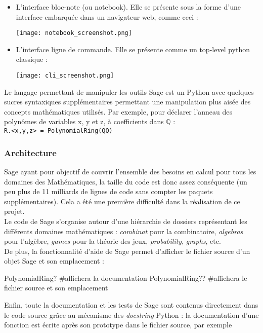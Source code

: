 \documentclass[12pt]{article}
\begin{document}
\noindent\begin{minipage}{\linewidth}
\begin{itemize}
\item L'interface bloc-note (ou notebook). Elle se présente sous la forme
 d'une interface embarquée dans un navigateur web, comme ceci :
\vspace{5mm}
\begin{center}
\texttt{[image: notebook\_screenshot.png]}
\end{center}
\item L'interface ligne de commande. Elle se présente comme un top-level
  python classique :
\vspace{5mm}
\begin{center}
\texttt{[image: cli\_screenshot.png]}
\end{center}
\end{itemize}
\end{minipage}

\vspace{1cm}
Le langage permettant de manipuler les outils Sage est un Python avec quelques sucres
syntaxiques supplémentaires permettant une manipulation plus aisée des
concepts mathématiques utilisés. Par exemple, pour déclarer l'anneau des
polynômes de variables x, y et z, à coefficients dans $\mathbb{Q}$ : \\
\verb|R.<x,y,z> = PolynomialRing(QQ)|

\subsubsection{Architecture}
Sage ayant pour objectif de couvrir l'ensemble des besoins en calcul pour
tous les domaines des Mathématiques, la taille du code est donc assez
conséquente (un peu plus de 11 milliards de lignes de code sans compter les
paquets supplémentaires). Cela a été une première difficulté dans la
réalisation de ce projet. \\
Le code de Sage s'organise autour d'une hiérarchie de dossiers représentant
les différents domaines mathématiques : \emph{combinat} pour la combinatoire,
\emph{algebras} pour l'algèbre, \emph{games} pour la théorie des jeux,
\emph{probability}, \emph{graphs}, etc.\\
De plus, la fonctionnalité d'aide de Sage permet d'afficher le fichier source
d'un objet Sage et son emplacement :
\begin{sageblock}
PolynomialRing? #affichera la documentation
PolynomialRing?? #affichera le fichier source et son emplacement
\end{sageblock}
Enfin, toute la documentation et les tests de Sage sont contenus directement dans le code
source grâce au mécanisme des \emph{docstring} Python : la documentation d'une
fonction est écrite après son prototype dans le fichier source, par exemple
\end{document}
